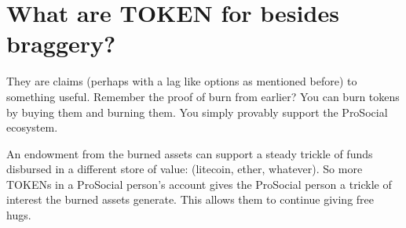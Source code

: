 \documentclass[12pt]{article}
\begin{document}
\section*{What are TOKEN for besides braggery?}
They are claims (perhaps with a lag like options as mentioned before) to something useful. Remember the proof of burn from earlier? You can burn tokens by buying them and burning them. You simply provably support the ProSocial ecosystem. 

An endowment from the burned assets can support a steady trickle of funds disbursed in a different store of value: (litecoin, ether, whatever). So more TOKENs in a ProSocial person's account gives the ProSocial person a trickle of interest the burned assets generate. This allows them to continue giving free hugs.
\end{document}
